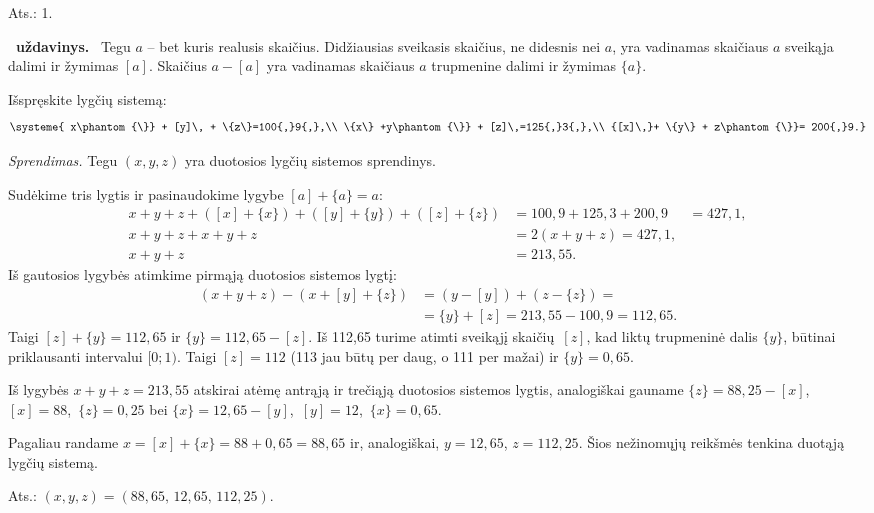 \documentclass[11pt,a4paper]{article}
\newcounter{uzdavinys}
\newenvironment{uzdavinys}
  {\refstepcounter{uzdavinys}\par\medskip\noindent\textbf{\theuzdavinys\ uždavinys.}\ }
  {\par\medskip}
\begin{document}
\begin{flushright}
Ats.: 1.
\end{flushright}
 \vspace{0,3cm}  


\begin{uzdavinys}
Tegu $a$ -- bet kuris realusis skaičius. Didžiausias sveikasis skaičius, ne didesnis nei $a$, yra vadinamas skaičiaus $a$ sveikąja dalimi ir žymimas $[a]$. Skaičius $a-[a]$ yra vadinamas skaičiaus $a$ trupmenine dalimi ir žymimas $\{a\}$.

Išspręskite lygčių sistemą:
$$\systeme{
x\phantom{\}} + [y]\, + \{z\}=100{,}9{,},\\
\{x\} +y\phantom{\}} + [z]\,=125{,}3{,},\\
{[x]\,}+ \{y\} + z\phantom{\}}= 200{,}9.}$$

\end{uzdavinys}

\textit{Sprendimas.} Tegu $(x, y, z)$ yra duotosios lygčių sistemos sprendinys.

Sudėkime tris lygtis ir pasinaudokime lygybe $[a]+\{a\}=a$:
\begin{align*}x+y+z+([x]+\{x\})+([y]+\{y\})+([z]+\{z\})&=100{,}9
+125{,}3+200{,}9&=427{,}1,\\
x+y+z+x+y+z&=2(x+y+z)=427{,}1,\\
x+y+z&=213{,}55.\end{align*}
Iš gautosios lygybės atimkime pirmąją duotosios sistemos lygtį:
\begin{align*}(x+y+z)-(x+ [y] + \{z\})&=(y-[y])+(z-\{z\})=\\&=\{y\}+[z]=213{,}55-
100{,}9=112{,}65.\end{align*}
Taigi $[z]+\{y\}=112{,}65$ ir $\{y\}=112{,}65-[z]$. Iš 112,65 turime atimti sveikąjį skaičių~$[z]$, kad liktų trupmeninė dalis $\{y\}$, būtinai priklausanti intervalui $[0; 1)$. Taigi $[z]=112$ (113 jau būtų per daug, o 111 per mažai) ir $\{y\}=0{,}65$.

Iš lygybės $x+y+z=213{,}55$ atskirai atėmę antrąją ir trečiąją duotosios sistemos lygtis, analogiškai gauname $\{z\}=88{,}25-[x]$, \,$[x]=88$, \,$\{z\}=0{,}25$ bei $\{x\}=12{,}65-[y]$, \,$[y]=12$, \,$\{x\}=0{,}65$.

Pagaliau randame $x=[x]+\{x\}=88+0{,}65=88{,}65$ ir, analogiškai, $y=12{,}65$, $z=112{,}25$. Šios nežinomųjų reikšmės tenkina duotąją lygčių sistemą.

\begin{flushright}
Ats.: $(x, y, z)=(88{,}65, \,12{,}65, \,112{,}25)$.
\end{flushright}
 \vspace{0,7cm}
\end{document}
